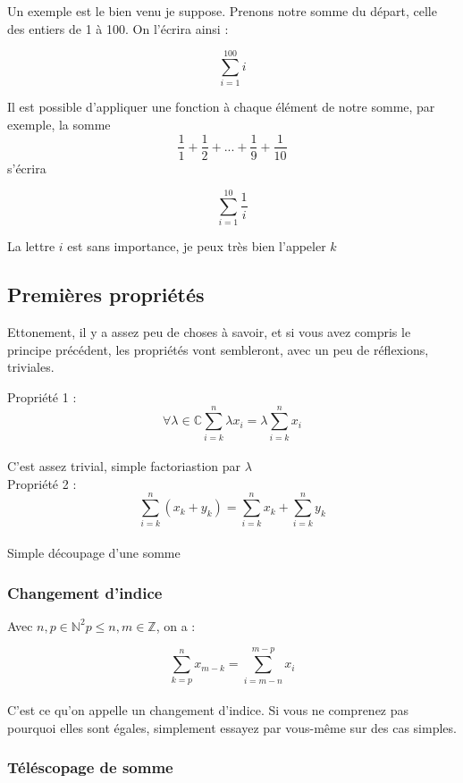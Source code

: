 \documentclass{article}
\begin{document}
Un exemple est le bien venu je suppose. Prenons notre somme du départ, celle des entiers de 1 à 100. On l'écrira ainsi :
\begin{center}
  \[\sum_{i=1}^{100} i\]
\end{center}

Il est possible d'appliquer une fonction à chaque élément de notre somme, par exemple, la somme \[\frac{1}{1} + \frac{1}{2} + ... +\frac{1}{9} + \frac{1}{10} \] s'écrira

\begin{center}
  \[\sum_{i=1}^{10} \frac{1}{i}\]
\end{center}
La lettre $i$ est sans importance, je peux très bien l'appeler $k$

\subsection{Premières propriétés}


Ettonement, il y a assez peu de choses à savoir, et si vous avez compris le principe précédent, les propriétés vont sembleront, avec un peu de réflexions, triviales.

Propriété 1 : \[\forall \lambda \in \mathbb{C} \sum_{i=k}^{n}\lambda x_{i} = \lambda \sum_{i=k}^{n}x_{i}\]\\
C'est assez trivial, simple factoriastion par $\lambda$\\
Propriété 2 : \[\sum_{i=k}^{n}(x_{k}+y_{k}) = \sum_{i=k}^{n}x_{k} +  \sum_{i=k}^{n}y_{k}\]\\
Simple découpage d'une somme

\subsubsection{Changement d'indice}

Avec $n, p \in \mathbb{N}^{2} p \le n, m \in \mathbb{Z}$, on a :

\[\sum_{k=p}^{n} x_{m-k} = \sum_{i=m-n}^{m-p} x_{i}\]\\

C'est ce qu'on appelle un changement d'indice. Si vous ne comprenez pas pourquoi elles sont égales, simplement essayez par vous-même sur des cas simples.

\subsubsection{Téléscopage de somme}
\end{document}
